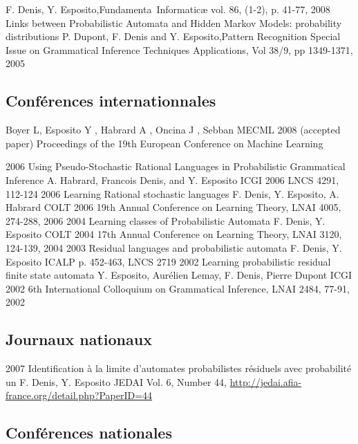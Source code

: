 {F. Denis, Y. Esposito,}{Fundamenta~Informatic\ae{}}
{vol. 86, (1-2), p. 41-77, 2008}\\
{Links between Probabilistic Automata and Hidden Markov Models: probability distributions}
{ P. Dupont, F. Denis and Y. Esposito,}{Pattern Recognition}
{Special Issue on Grammatical Inference Techniques \amper{} Applications, Vol 38/9, pp 1349-1371, 2005}

\subsection*{Conférences internationnales}

{Boyer L, Esposito Y , Habrard A , Oncina J , Sebban M}{ECML 2008}
{(accepted paper) Proceedings of the 19th European Conference on Machine Learning}



\article
{2006} %
{Using Pseudo-Stochastic Rational Languages in Probabilistic Grammatical Inference} %
{A. Habrard, Francois Denis, and Y. Esposito} %
{ICGI 2006} %
{LNCS 4291, 112-124} %
\article
{2006}
{Learning Rational stochastic languages}
{F. Denis, Y. Esposito, A. Habrard}
{COLT 2006}
{19th Annual Conference on Learning Theory, LNAI 4005, 274-288, 2006}
\article
{2004}
{Learning classes of Probabilistic Automata}
{F. Denis, Y. Esposito}
{COLT 2004}
{17th Annual Conference on Learning Theory, LNAI 3120, 124-139, 2004}
\article
{2003}
{Residual languages and probabilistic automata}
{F. Denis, Y. Esposito}
{ICALP}
{p. 452-463, LNCS 2719}
\article
{2002}
{Learning probabilistic residual finite state automata}
{Y. Esposito, Aurélien Lemay, F. Denis, Pierre Dupont}
{ICGI 2002}
{6th International Colloquium on Grammatical Inference,  LNAI 2484, 77-91, 2002}

\subsection*{Journaux nationaux}

\article
{2007}
{Identification à la limite d'automates probabilistes résiduels avec probabilité un}
{F. Denis, Y. Esposito}
{JEDAI}
{Vol. 6, Number 44, \href{http://jedai.afia-france.org/detail.php?PaperID=44}{http://jedai.afia-france.org/detail.php?PaperID=44}}

\subsection*{Conférences nationales}

